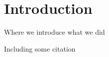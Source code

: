 \section{Introduction}

Where we introduce what we did

Including some citation \cite{Lamport:LaTeX}
